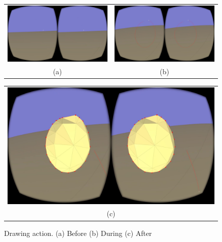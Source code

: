 \begin{figure}[!h]
    \centering
    \setlength{\tabcolsep}{0.0130\linewidth}
    \begin{tabular}{@{}cc@{}}
    \includegraphics[width=0.45\linewidth]{figures/pre_draw} &
       	\includegraphics[width=0.45\linewidth]{figures/during_draw} \\
       	(a)&(b)\\
       	\end{tabular}
       	
       	  \centering
    \setlength{\tabcolsep}{0.0130\linewidth}
    \begin{tabular}{@{}c@{}}
    \includegraphics[width=0.926\linewidth]{figures/post_draw}\\
    (c)
    \end{tabular}
    
   
    \caption[Drawing action]{Drawing action.
    	  \textup{(a)} Before \textup{(b)} During \textup{(c)} After
      \label{fig:draw_example}}
\end{figure}

